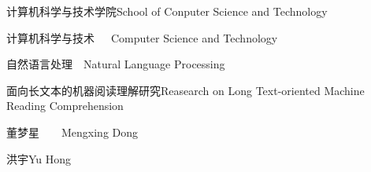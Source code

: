 
\school
{计算机科学与技术学院}{School of Conputer Science and Technology}

\major
{计算机科学与技术~~~}{Computer Science and Technology}

\direct
{自然语言处理~~}{Natural Language Processing}

\thesistitle
{面向长文本的机器阅读理解研究}{Reasearch on Long Text-oriented Machine Reading Comprehension}

\thesisauthor
{董梦星~~~~}{Mengxing Dong}

\teacher
{洪宇}{Yu Hong}





